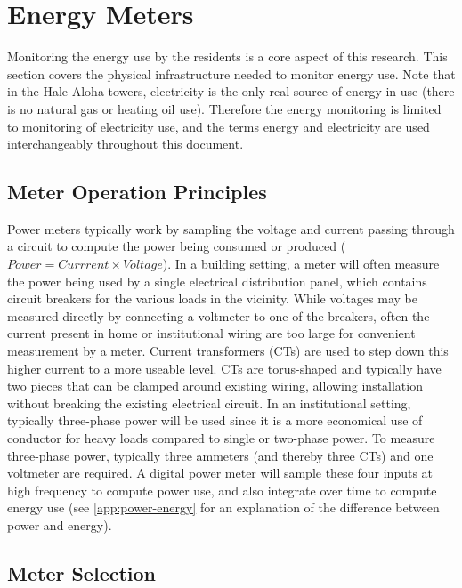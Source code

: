 \section{Energy Meters}

Monitoring the energy use by the residents is a core aspect of this research. This section covers the physical infrastructure needed to monitor energy use. Note that in the Hale Aloha towers, electricity is the only real source of energy in use (there is no natural gas or heating oil use). Therefore the energy monitoring is limited to monitoring of electricity use, and the terms energy and electricity are used interchangeably throughout this document.


\subsection{Meter Operation Principles}

Power meters typically work by sampling the voltage and current passing through a circuit to compute the power being consumed or produced ($Power = Currrent \times Voltage$). In a building setting, a meter will often measure the power being used by a single electrical distribution panel, which contains circuit breakers for the various loads in the vicinity. While voltages may be measured directly by connecting a voltmeter to one of the breakers, often the current present in home or institutional wiring are too large for convenient measurement by a meter. Current transformers (CTs) are used to step down this higher current to a more useable level. CTs are torus-shaped and typically have two pieces that can be clamped around existing wiring, allowing installation without breaking the existing electrical circuit. In an institutional setting, typically three-phase power will be used since it is a more economical use of conductor for heavy loads compared to single or two-phase power. To measure three-phase power, typically three ammeters (and thereby three CTs) and one voltmeter are required. A digital power meter will sample these four inputs at high frequency to compute power use, and also integrate over time to compute energy use (see \autoref{app:power-energy} for an explanation of the difference between power and energy).


\subsection{Meter Selection}
\label{sec:meter-selection}

